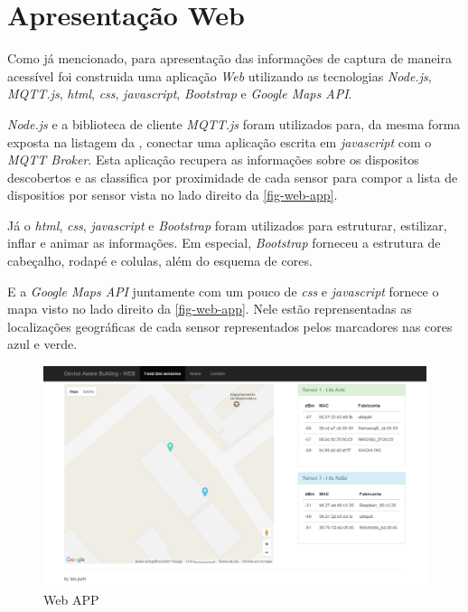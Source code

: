 \section{Apresentação Web}
\label{sec:app-web}

Como já mencionado, para apresentação das informações de captura de maneira
acessível foi construida uma aplicação \emph{Web} utilizando as tecnologias
\emph{Node.js}, \emph{MQTT.js}, \emph{html}, \emph{css}, \emph{javascript},
\emph{Bootstrap} e \emph{Google Maps API}.

\emph{Node.js} e a biblioteca de cliente \emph{MQTT.js} foram utilizados para,
da mesma forma exposta na listagem da , conectar
uma aplicação escrita em \emph{javascript} com o \emph{MQTT Broker}. Esta
aplicação recupera as informações sobre os dispositos descobertos e as
classifica por proximidade de cada sensor para compor a lista de dispositios
por sensor vista no lado direito da \autoref{fig-web-app}.

Já o \emph{html}, \emph{css}, \emph{javascript} e \emph{Bootstrap} foram
utilizados para estruturar, estilizar, inflar e animar as informações. Em
especial, \emph{Bootstrap} forneceu a estrutura de cabeçalho, rodapé e colulas,
além do esquema de cores.

E a \emph{Google Maps API} juntamente com um pouco de \emph{css} e
\emph{javascript} fornece o mapa visto no lado direito da \autoref{fig-web-app}.
Nele estão reprensentadas as localizações geográficas de cada sensor
representados pelos marcadores nas cores azul e verde.

\begin{figure}[htb]
	\caption{\label{fig-web-app}Web APP}
	\begin{center}
		\includegraphics[width=1\textwidth]{050-construcao/web-app.png}
	\end{center}
\end{figure}

